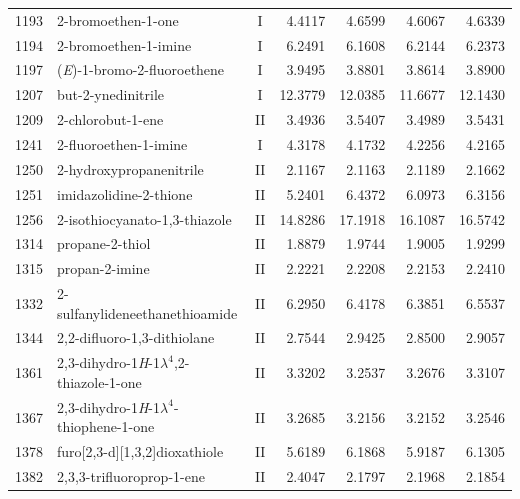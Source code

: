 \begin{longtable}{rlcd{2.5}d{2.5}d{2.5}d{2.5}}
    1193 & 2-bromoethen-1-one                                     & I  & 4.4117  & 4.6599  & 4.6067  & 4.6339  \\
    1194 & 2-bromoethen-1-imine                                   & I  & 6.2491  & 6.1608  & 6.2144  & 6.2373  \\
    1197 & (\textit{E})-1-bromo-2-fluoroethene                    & I  & 3.9495  & 3.8801  & 3.8614  & 3.8900  \\
    1207 & but-2-ynedinitrile                                     & I  & 12.3779 & 12.0385 & 11.6677 & 12.1430 \\
    1209 & 2-chlorobut-1-ene                                      & II & 3.4936  & 3.5407  & 3.4989  & 3.5431  \\
    1241 & 2-fluoroethen-1-imine                                  & I  & 4.3178  & 4.1732  & 4.2256  & 4.2165  \\
    1250 & 2-hydroxypropanenitrile                                & II & 2.1167  & 2.1163  & 2.1189  & 2.1662  \\
    1251 & imidazolidine-2-thione                                 & II & 5.2401  & 6.4372  & 6.0973  & 6.3156  \\
    1256 & 2-isothiocyanato-1,3-thiazole                          & II & 14.8286 & 17.1918 & 16.1087 & 16.5742 \\
    1314 & propane-2-thiol                                        & II & 1.8879  & 1.9744  & 1.9005  & 1.9299  \\
    1315 & propan-2-imine                                         & II & 2.2221  & 2.2208  & 2.2153  & 2.2410  \\
    1332 & 2-sulfanylideneethanethioamide                         & II & 6.2950  & 6.4178  & 6.3851  & 6.5537  \\
    1344 & 2,2-difluoro-1,3-dithiolane                            & II & 2.7544  & 2.9425  & 2.8500  & 2.9057  \\
    1361 & 2,3-dihydro-1\textit{H}-1$\lambda^4$,2-thiazole-1-one  & II & 3.3202  & 3.2537  & 3.2676  & 3.3107  \\
    1367 & 2,3-dihydro-1\textit{H}-1$\lambda^4$-thiophene-1-one   & II & 3.2685  & 3.2156  & 3.2152  & 3.2546  \\
    1378 & furo[2,3-d][1,3,2]dioxathiole                          & II & 5.6189  & 6.1868  & 5.9187  & 6.1305  \\
    1382 & 2,3,3-trifluoroprop-1-ene                              & II & 2.4047  & 2.1797  & 2.1968  & 2.1854  \\

\end{longtable}
